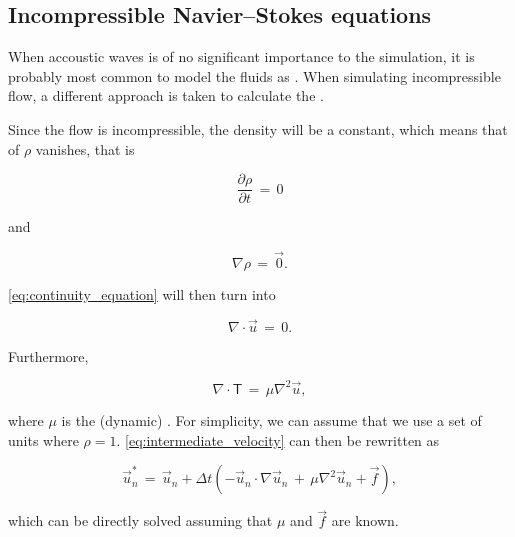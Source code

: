 \subsection{Incompressible Navier--Stokes equations}

When accoustic waves is of no significant importance to the simulation, it is probably most common to model the fluids as \incompressible. When simulating incompressible flow, a different approach is taken to calculate the .

Since the flow is incompressible, the density will be a constant, which means that \derivatives of $\rho$ vanishes, that is

\begin{equation} \label{eq:density_partial_time_derivative_incompressible_flow}
\frac{\partial \rho}{\partial t} \,=\, 0
\end{equation}

and

\begin{equation} \label{eq:density_divergence_incompressible_flow}
\nabla\rho \,=\, \vec{0}.
\end{equation}

\eqref{eq:continuity_equation} will then turn into

\begin{equation} \label{eq:velocity_divergence_incompressible_flow}
\nabla\cdot\vec{u} \,=\, 0.
\end{equation}

Furthermore, %

\begin{equation} \label{eq:deviatoric_stress_tensor_incompressible_flow}
\nabla\cdot\boldsymbol{\mathsf{T}} \,=\, \mu\nabla^2\vec{u},
\end{equation}

where $\mu$ is the (dynamic) \viscosity{}. For simplicity, we can assume that we use a set of units where $\rho = 1$. \eqref{eq:intermediate_velocity} can then be rewritten as

\begin{equation} \label{eq:intermediate_velocity_reduced}
\vec{u}^*_n \,= \, \vec{u}_{n} + \Delta t(- \vec{u}_{n}\cdot\nabla\vec{u}_{n} \,+\, \mu\nabla^2\vec{u}_{n} + \vec{f}),
\end{equation}

which can be directly solved assuming that $\mu$ and $\vec{f}$ are known.

